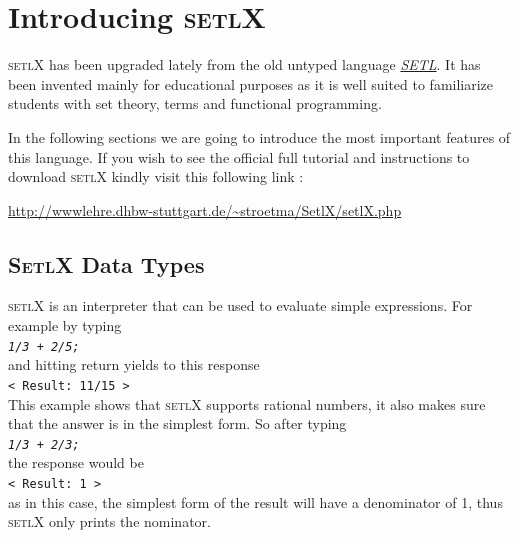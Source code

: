 \documentclass[11pt]{report}
\begin{document}
\chapter{Introducing \textsc{setlX}}

\textsc{setlX} has been upgraded lately from the old untyped language \href{http://en.wikipedia.org/wiki/SETL}{\emph{SETL}}. It has been invented mainly for educational purposes as it is well suited to familiarize students with set theory, terms and functional programming.

In the following sections we are going to introduce the most important features of this language. If you wish to see the official full tutorial and instructions to download \textsc{setlX} kindly visit this following link : 

\begin{center}
\url{http://wwwlehre.dhbw-stuttgart.de/~stroetma/SetlX/setlX.php} 
\end{center}

\section{\textsc{SetlX} Data Types}

\textsc{setlX} is an interpreter that can be used to evaluate simple expressions. For example by typing 
\\[0.2cm]
\hspace*{1.3cm}
\texttt{\textsl{1/3 + 2/5;}}
\\[0.2cm]
and hitting return yields to this response
\\[0.2cm]
\hspace*{1.3cm}
\texttt{< Result: 11/15 >}
\\[0.2cm]
This example shows that \textsc{setlX} supports rational numbers, it also makes sure that the answer is in the simplest form. So after typing
\\[0.2cm]
\hspace*{1.3cm}
\texttt{\textsl{1/3 + 2/3;}}
\\[0.2cm]
the response would be
\\[0.2cm]
\hspace*{1.3cm}
\texttt{< Result: 1 >}
\\[0.2cm]
as in this case, the simplest form of the result will have a denominator of 1, thus \textsc{setlX} only prints the nominator.
\end{document}
